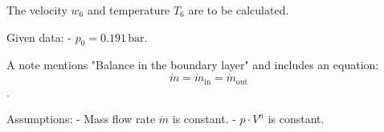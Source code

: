 The velocity \( w_6 \) and temperature \( T_6 \) are to be calculated.  

Given data:  
- \( p_0 = 0.191 \, \text{bar} \).  

A note mentions "Balance in the boundary layer" and includes an equation:  
\[ \dot{m} = \dot{m}_{\text{in}} = \dot{m}_{\text{out}} \].  

Assumptions:  
- Mass flow rate \( \dot{m} \) is constant.  
- \( p \cdot V^n \) is constant.